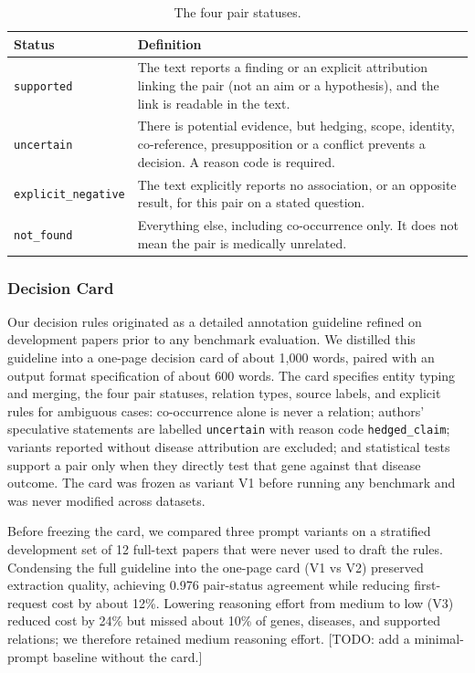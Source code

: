 \documentclass[preprint,10pt,letterpaper]{elsarticle}
\newcommand{\st}[1]{\texttt{#1}}             %
\newcommand{\todo}[1]{\textcolor{stneg}{[TODO: #1]}}
\begin{document}
\begin{table}[!htbp]
\centering\footnotesize
\caption{The four pair statuses.}
\label{tab:status}
\begin{tabularx}{\linewidth}{@{}lX@{}}
\toprule
Status & Definition\\
\midrule
\textcolor{stsup}{\st{supported}} & The text reports a finding or an explicit attribution linking the pair (not an aim or a hypothesis), and the link is readable in the text.\\
\textcolor{stunc}{\st{uncertain}} & There is potential evidence, but hedging, scope, identity, co-reference, presupposition or a conflict prevents a decision. A reason code is required.\\
\textcolor{stneg}{\st{explicit\_negative}} & The text explicitly reports no association, or an opposite result, for this pair on a stated question.\\
\textcolor{stnf}{\st{not\_found}} & Everything else, including co-occurrence only. It does not mean the pair is medically unrelated.\\
\bottomrule
\end{tabularx}
\end{table}

\subsubsection{Decision Card}
Our decision rules originated as a detailed annotation guideline refined on development papers prior to any benchmark evaluation. We distilled this guideline into a one-page decision card of about 1,000 words, paired with an output format specification of about 600 words. The card specifies entity typing and merging, the four pair statuses, relation types, source labels, and explicit rules for ambiguous cases: co-occurrence alone is never a relation; authors' speculative statements are labelled \st{uncertain} with reason code \st{hedged\_claim}; variants reported without disease attribution are excluded; and statistical tests support a pair only when they directly test that gene against that disease outcome. The card was frozen as variant V1 before running any benchmark and was never modified across datasets.

Before freezing the card, we compared three prompt variants on a stratified development set of 12 full-text papers that were never used to draft the rules. Condensing the full guideline into the one-page card (V1 vs V2) preserved extraction quality, achieving 0.976 pair-status agreement while reducing first-request cost by about 12\%. Lowering reasoning effort from medium to low (V3) reduced cost by 24\% but missed about 10\% of genes, diseases, and supported relations; we therefore retained medium reasoning effort. \todo{add a minimal-prompt baseline without the card.}
\end{document}
